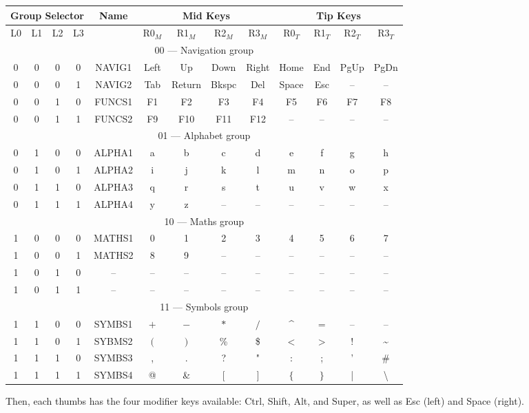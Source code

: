 \documentclass{article}
\begin{document}
\begin{center}
	\begin{tabular}{|cccc|c|cccc|cccc|}
		\hline
		\multicolumn{4}{|c|}{Group Selector} & Name & \multicolumn{4}{|c|}{Mid Keys} & \multicolumn{4}{|c|}{Tip Keys} \\ \hline
		L0 & L1 & L2 & L3 &  & R0$_M$ & R1$_M$ & R2$_M$ & R3$_M$ & R0$_T$ & R1$_T$ & R2$_T$ & R3$_T$ \\ \hline
		\multicolumn{13}{|c|}{00 --- Navigation group}\\ \hline
		0 & 0 & 0 & 0 & NAVIG1 & Left & Up & Down & Right & Home & End & PgUp & PgDn \\ \hline
		0 & 0 & 0 & 1 & NAVIG2 & Tab & Return & Bkspc & Del & Space & Esc & -- & -- \\ \hline
		0 & 0 & 1 & 0 & FUNCS1 & F1 & F2 & F3 & F4 & F5 & F6 & F7 & F8 \\ \hline
		0 & 0 & 1 & 1 & FUNCS2 & F9 & F10 & F11 & F12 & -- & -- & -- & -- \\ \hline
		\multicolumn{13}{|c|}{01 --- Alphabet group}\\ \hline
		0 & 1 & 0 & 0 & ALPHA1 & a & b & c & d & e & f & g & h \\ \hline
		0 & 1 & 0 & 1 & ALPHA2 & i & j & k & l & m & n & o & p \\ \hline
		0 & 1 & 1 & 0 & ALPHA3 & q & r & s & t & u & v & w & x \\ \hline
		0 & 1 & 1 & 1 & ALPHA4 & y & z & -- & -- & -- & -- & -- & -- \\ \hline
		\multicolumn{13}{|c|}{10 --- Maths group}\\ \hline
		1 & 0 & 0 & 0 & MATHS1 & 0 & 1 & 2 & 3 & 4 & 5 & 6 & 7 \\ \hline
		1 & 0 & 0 & 1 & MATHS2 & 8 & 9 & -- & -- & -- & -- & -- & -- \\ \hline
		1 & 0 & 1 & 0 & --     & -- & -- & -- & -- & -- & -- & -- & -- \\ \hline
		1 & 0 & 1 & 1 & --     & -- & -- & -- & -- & -- & -- & -- & -- \\ \hline
		\multicolumn{13}{|c|}{11 --- Symbols group}\\ \hline
		1 & 1 & 0 & 0 & SYMBS1 & $+$ & $-$ & $*$ & $/$ & \textasciicircum & $=$ & -- & -- \\ \hline
		1 & 1 & 0 & 1 & SYBMS2 & $($ & $)$ & \% & \$ & $<$ & $>$ & ! & \textasciitilde \\ \hline
		1 & 1 & 1 & 0 & SYMBS3 & , & . & ? & " & : & ; & ' & \# \\ \hline
		1 & 1 & 1 & 1 & SYMBS4 & @ & \& & $[$ & $]$ & $\{$ & $\}$ & | & \textbackslash \\ \hline
		
	\end{tabular}
\end{center}

Then, each thumbs has the four modifier keys available: Ctrl, Shift, Alt, and Super, as well as Esc (left) and Space (right).
\end{document}
